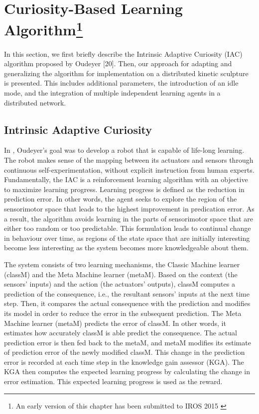 \chapter[Curiosity-Based Learning Algorithm]{Curiosity-Based Learning Algorithm\footnote{An early version of this chapter has been submitted to IROS 2015 \cite{Chan2015} }} \label{chap:cbla}
 
In this section, we first briefly describe the Intrinsic Adaptive Curiosity (IAC) algorithm proposed by Oudeyer [20]. Then, our approach for adapting and generalizing the algorithm for implementation on a distributed kinetic sculpture is presented. This includes additional parameters, the introduction of an idle mode, and the integration of multiple independent learning agents in a distributed network. 

\section{Intrinsic Adaptive Curiosity}

In \cite{Oudeyer2007}, Oudeyer's goal was to develop a robot that is capable of life-long learning. The robot makes sense of the mapping between its actuators and sensors through continuous self-experimentation, without explicit instruction from human experts. Fundamentally, the IAC is a reinforcement learning algorithm with an objective to maximize learning progress. Learning progress is defined as the reduction in prediction error. In other words, the agent seeks to explore the region of the sensorimotor space that leads to the highest improvement in predication error. As a result, the algorithm avoids learning in the parts of sensorimotor space that are either too random or too predictable. This formulation leads to continual change in behaviour over time, as regions of the state space that are initially interesting become less interesting as the system becomes more knowledgeable about them. 
 
The system consists of two learning mechanisms, the Classic Machine learner (classM) and the Meta Machine learner (metaM).  Based on the context (the sensors' inputs) and the action (the actuators' outputs), classM computes a prediction of the consequence, i.e., the resultant sensors' inputs at the next time step. Then, it compares the actual consequence with the prediction and modifies its model in order to reduce the error in the subsequent prediction. The Meta Machine learner (metaM) predicts the error of classM. In other words, it estimates how accurately classM is able predict the consequence. The actual prediction error is then fed back to the metaM, and metaM modifies its estimate of prediction error of the newly modified classM. This change in the prediction error is recorded at each time step in the knowledge gain assessor (KGA). The KGA then computes the expected learning progress by calculating the change in error estimation.  This expected learning progress is used as the reward. 

